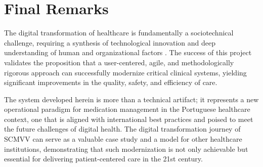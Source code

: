\section{Final Remarks}

The digital transformation of healthcare is fundamentally a sociotechnical challenge, requiring a synthesis of technological innovation and deep understanding of human and organizational factors \cite{greenhalgh2017}. The success of this project validates the proposition that a user-centered, agile, and methodologically rigorous approach can successfully modernize critical clinical systems, yielding significant improvements in the quality, safety, and efficiency of care.

The system developed herein is more than a technical artifact; it represents a new operational paradigm for medication management in the Portuguese healthcare context, one that is aligned with international best practices \cite{who2022} and poised to meet the future challenges of digital health. The digital transformation journey of SCMVV can serve as a valuable case study and a model for other healthcare institutions, demonstrating that such modernization is not only achievable but essential for delivering patient-centered care in the 21st century. 